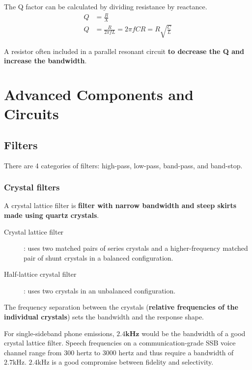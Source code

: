\documentclass[letterpaper]{article}
\begin{document}
        The Q factor can be calculated by dividing resistance by reactance.
        \begin{align*}
            Q &= \frac{R}{X} \\
            Q &= \frac{R}{2 \pi f L} = 2 \pi f C R = R \sqrt{\frac{C}{L}}
        \end{align*}

        A resistor often included in a parallel resonant circuit \textbf{to decrease the Q and increase the bandwidth}.

    \newpage

    \section{Advanced Components and Circuits}
        \subsection{Filters}
        There are 4 categories of filters: high-pass, low-pass, band-pass, and band-stop.

        \subsubsection{Crystal filters}
        A crystal lattice filter is \textbf{filter with narrow bandwidth and steep skirts made using quartz crystals}.

        \begin{description}
            \item[Crystal lattice filter]: uses two matched pairs of series crystals and a higher-frequency matched pair of shunt crystals in a balanced configuration.
            \item[Half-lattice crystal filter]: uses two crystals in an unbalanced configuration.
        \end{description}

        The frequency separation between the crystals (\textbf{relative frequencies of the individual crystals}) sets the bandwidth and the response shape.

        For single-sideband phone emissions, $ \mathbf{2.4} \mathrm{\textbf{kHz}} $ would be the bandwidth of a good crystal lattice filter.
        Speech frequencies on a communication-grade SSB voice channel range from 300 hertz to 3000 hertz and thus require a bandwidth of $ 2.7 \mathrm{kHz} $.
        $ 2.4 \mathrm{kHz} $ is a good compromise between fidelity and selectivity.
\end{document}
